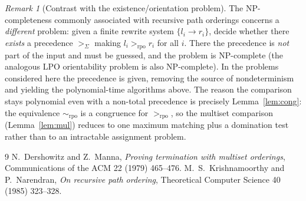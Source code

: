 \documentclass{amsart}
\theoremstyle{definition}
\theoremstyle{remark}
\newtheorem{remark}{Remark}
\newcommand{\rpo}{>_{\mathrm{rpo}}}
\newcommand{\sig}{\Sigma}
\newcommand{\prc}{>_{\sig}}
\begin{document}
\begin{remark}[Contrast with the existence/orientation problem]\label{rem:existence}
The $\mathrm{NP}$-completeness commonly associated with recursive path orderings
\cite{KN} concerns a \emph{different} problem: given a finite rewrite system
$\{l_i\to r_i\}$, decide whether there \emph{exists} a precedence $\prc$ making
$l_i\rpo r_i$ for all $i$. There the precedence is \emph{not} part of the input
and must be guessed, and the problem is $\mathrm{NP}$-complete (the analogous LPO
orientability problem is also $\mathrm{NP}$-complete). In the problems considered
here the precedence is given, removing the source of nondeterminism and yielding
the polynomial-time algorithms above. The reason the comparison stays polynomial
even with a non-total precedence is precisely Lemma~\ref{lem:cong}: the
equivalence $\sim_{\mathrm{rpo}}$ is a congruence for $\rpo$, so the multiset
comparison (Lemma~\ref{lem:mul}) reduces to one maximum matching plus a
domination test rather than to an intractable assignment problem.
\end{remark}

\begin{thebibliography}{9}
 N.~Dershowitz and Z.~Manna,
\emph{Proving termination with multiset orderings},
Communications of the ACM 22 (1979) 465--476.
 M.~S.~Krishnamoorthy and P.~Narendran,
\emph{On recursive path ordering},
Theoretical Computer Science 40 (1985) 323--328.
\end{thebibliography}
\end{document}
